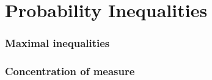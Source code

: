 \part{Probability Inequalities}






%
%
\section{Maximal inequalities}





%
%
\section{Concentration of measure}


